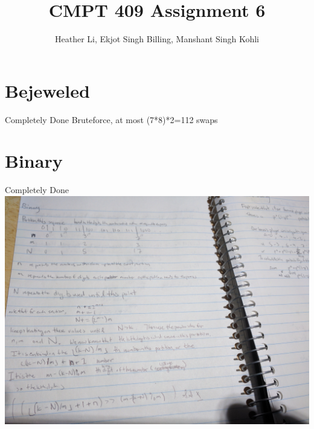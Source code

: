 \documentclass{article}
\title{CMPT 409 Assignment 6}
\author{Heather Li, Ekjot Singh Billing, Manshant Singh Kohli}
\begin{document}
\maketitle

\section{Bejeweled}
Completely Done
Bruteforce, at most (7*8)*2=112 swaps



\section{Binary}
Completely Done
\includegraphics[width=.75\textwidth]{binary}
\end{document}

